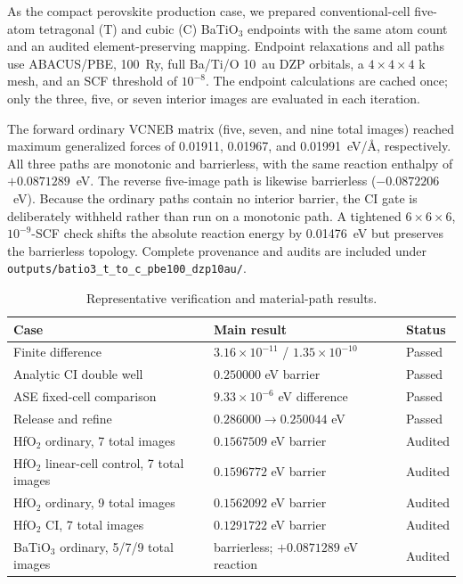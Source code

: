 \documentclass[final,3p,times]{elsarticle}
\begin{document}
As the compact perovskite production case, we prepared conventional-cell
five-atom tetragonal (T) and cubic (C) BaTiO$_3$ endpoints with the same atom
count and an audited element-preserving mapping.  Endpoint relaxations and all
paths use ABACUS/PBE, 100~Ry, full Ba/Ti/O 10~au DZP orbitals, a $4\times4\times4$
k mesh, and an SCF threshold of $10^{-8}$.  The endpoint calculations are
cached once; only the three, five, or seven interior images are evaluated in
each iteration.

The forward ordinary VCNEB matrix (five, seven, and nine total images) reached
maximum generalized forces of 0.01911, 0.01967, and 0.01991~eV/\AA,
respectively.  All three paths are monotonic and barrierless, with the same
reaction enthalpy of $+0.0871289$~eV.  The reverse five-image path is likewise
barrierless ($-0.0872206$~eV).  Because the ordinary paths contain no interior
barrier, the CI gate is deliberately withheld rather than run on a monotonic
path.  A tightened $6\times6\times6$, $10^{-9}$-SCF check shifts the absolute
reaction energy by 0.01476~eV but preserves the barrierless topology.
Complete provenance and audits are included under
\texttt{outputs/batio3\_t\_to\_c\_pbe100\_dzp10au/}.

\begin{table}[!htbp]
\centering
\caption{Representative verification and material-path results.}
\label{tab:examples}
\begin{tabularx}{\linewidth}{l>{\raggedleft\arraybackslash}X>{\raggedleft\arraybackslash}X}
\toprule
Case & Main result & Status \\
\midrule
Finite difference & $3.16\times10^{-11}$ / $1.35\times10^{-10}$ & Passed \\
Analytic CI double well & $0.250000$ eV barrier & Passed \\
ASE fixed-cell comparison & $9.33\times10^{-6}$ eV difference & Passed \\
Release and refine & $0.286000\rightarrow0.250044$ eV & Passed \\
HfO$_2$ ordinary, 7 total images & $0.1567509$ eV barrier & Audited \\
HfO$_2$ linear-cell control, 7 total images & $0.1596772$ eV barrier & Audited \\
HfO$_2$ ordinary, 9 total images & $0.1562092$ eV barrier & Audited \\
HfO$_2$ CI, 7 total images & $0.1291722$ eV barrier & Audited \\
BaTiO$_3$ ordinary, 5/7/9 total images & barrierless; $+0.0871289$ eV reaction & Audited \\
\bottomrule
\end{tabularx}
\end{table}
\end{document}
